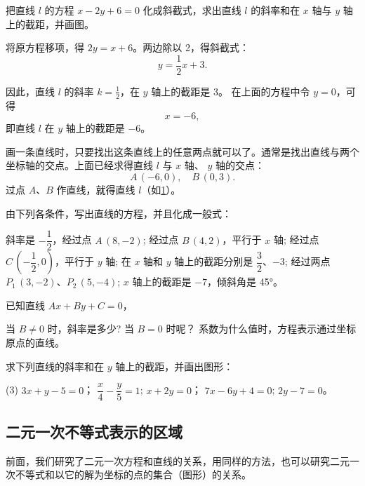 \begin{example}
  把直线 $l$ 的方程 $x-2y+6=0$ 化成斜截式，求出直线 $l$ 的斜率和在 $x$ 轴与 $y$ 轴上的截距，并画图。
\end{example}
\begin{solution}
  将原方程移项，得 $2y=x+6$。两边除以 2，得斜截式：
  \[ y = \frac{1}{2}x + 3.\]

  因此，直线 $l$ 的斜率 $k=\frac{1}{2}$，在 $y$ 轴上的截距是 3。
  在上面的方程中令 $y=0$，可得
  \[x = - 6,\]
  即直线 $l$ 在 $y$ 轴上的截距是 $-6$。
  
  画一条直线时，只要找出这条直线上的任意两点就可以了。通常是找出直线与两个坐标轴的交点。上面已经求得直线 \(l\) 与 \(x\) 轴、 \(y\) 轴的交点：
\[A\,(-6,0),\quad B\,(0,3).\]
过点 $A$、$B$ 作直线，就得直线 $l$（如\cref{fig:1-23}）。
\end{solution}
\begin{figure}
  \caption{}\label{fig:1-23}
\end{figure}

\begin{Practice}
  \begin{question}
    \item 由下列各条件，写出直线的方程，并且化成一般式：
    \begin{tasks}
      \task 斜率是 $-\dfrac{1}{2}$，经过点 $A\,(8,-2)$;
      \task 经过点 $B\,(4,2)$，平行于 $x$ 轴;
      \task 经过点 $C\,(-\dfrac{1}{2},0)$，平行于 $y$ 轴;
      \task 在 $x$ 轴和 $y$ 轴上的截距分别是 $\dfrac{3}{2}$、$-3$;
      \task 经过两点 $P_1\,(3,-2)$、$P_2\,(5,- 4)$;
      \task $x$ 轴上的截距是 $-7$，倾斜角是 \ang{45}。
    \end{tasks}
    \item 已知直线 $Ax+By+C=0$，
    \begin{tasks}
      \task 当 $B\neq 0$ 时，斜率是多少? 当 $B = 0$ 时呢？
      \task 系数为什么值时，方程表示通过坐标原点的直线。
    \end{tasks}
    \item 求下列直线的斜率和在 $y$ 轴上的截距，并画出图形：
    \begin{tasks}(3)
      \task $3x+y-5=0$；
      \task $\dfrac{x}{4}-\dfrac{y}{5}=1$;
      \task $x+2y= 0$；
      \task $7x-6y+4=0$;
      \task $2y-7= 0$。
    \end{tasks}
  \end{question}
\end{Practice}

\subsection{二元一次不等式表示的区域}
前面，我们研究了二元一次方程和直线的关系，用同样的方法，也可以研究二元一次不等式和以它的解为坐标的点的集合（图形）的关系。

